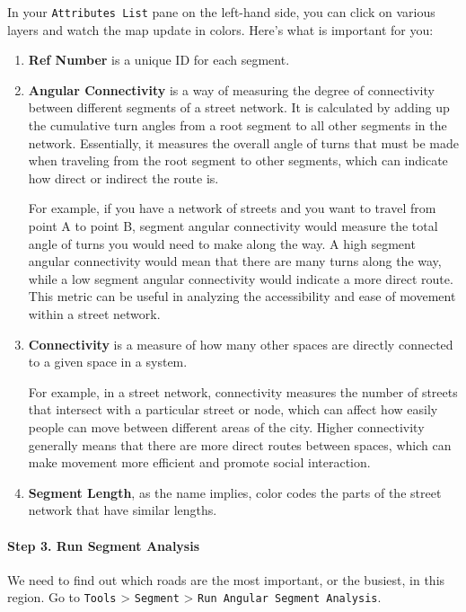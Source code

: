 \documentclass[
]{latex/krantz}
\begin{document}
In your \texttt{Attributes\ List} pane on the left-hand side, you can click on various layers and watch the map update in colors. Here's what is important for you:

\begin{enumerate}
\def\labelenumi{\arabic{enumi}.}
\item
  \textbf{Ref Number} is a unique ID for each segment.
\item
  \textbf{Angular Connectivity} is a way of measuring the degree of connectivity between different segments of a street network. It is calculated by adding up the cumulative turn angles from a root segment to all other segments in the network. Essentially, it measures the overall angle of turns that must be made when traveling from the root segment to other segments, which can indicate how direct or indirect the route is.

  For example, if you have a network of streets and you want to travel from point A to point B, segment angular connectivity would measure the total angle of turns you would need to make along the way. A high segment angular connectivity would mean that there are many turns along the way, while a low segment angular connectivity would indicate a more direct route. This metric can be useful in analyzing the accessibility and ease of movement within a street network.
\item
  \textbf{Connectivity} is a measure of how many other spaces are directly connected to a given space in a system.

  For example, in a street network, connectivity measures the number of streets that intersect with a particular street or node, which can affect how easily people can move between different areas of the city. Higher connectivity generally means that there are more direct routes between spaces, which can make movement more efficient and promote social interaction.
\item
  \textbf{Segment Length}, as the name implies, color codes the parts of the street network that have similar lengths.
\end{enumerate}

\hypertarget{step-3.-run-segment-analysis}{%
\paragraph*{Step 3. Run Segment Analysis}\label{step-3.-run-segment-analysis}}

We need to find out which roads are the most important, or the busiest, in this region. Go to \texttt{Tools} \textgreater{} \texttt{Segment} \textgreater{} \texttt{Run\ Angular\ Segment\ Analysis}.
\end{document}
